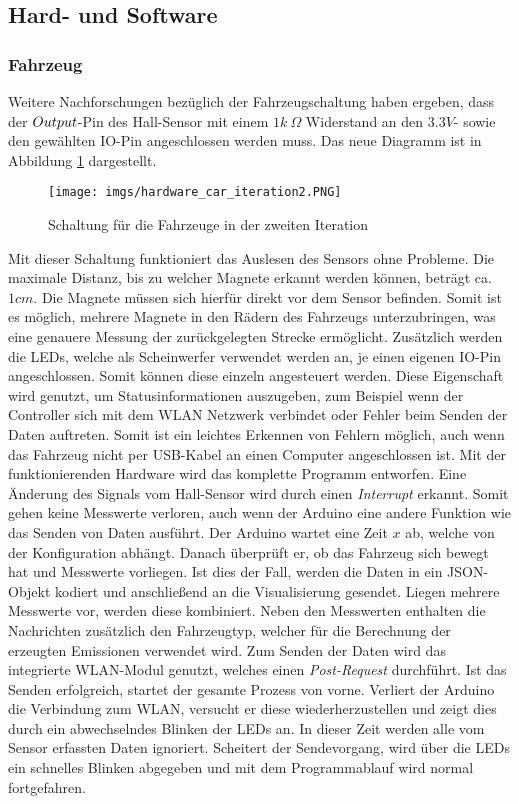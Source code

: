 \documentclass[.../Dokumentation.tex]{subfiles}
\begin{document}
    \subsection{Hard- und Software}\label{sec-ita2-hardware}
    \subsubsection*{Fahrzeug}
    Weitere Nachforschungen bezüglich der Fahrzeugschaltung haben ergeben, dass der $Out\-put$-Pin des Hall-Sensor mit einem $1k\ \Omega$  Widerstand an den $3.3V$- sowie den gewählten IO-Pin angeschlossen werden muss. Das neue Diagramm ist in Abbildung \ref{fig-hardware-car-iteration2} dargestellt.
       	\begin{figure}[H]
    	\begin{center}
    		\texttt{[image: imgs/hardware\_car\_iteration2.PNG]}
    		\caption{Schaltung für die Fahrzeuge in der zweiten Iteration }
    		\label{fig-hardware-car-iteration2}
    	\end{center}
    \end{figure}
    \noindent
    Mit dieser Schaltung funktioniert das Auslesen des Sensors ohne Probleme. Die maximale Distanz, bis zu welcher Magnete erkannt werden können, beträgt ca. $1 cm$. Die Magnete müssen sich hierfür direkt vor dem Sensor befinden. Somit ist es möglich, mehrere Magnete in den Rädern des Fahrzeugs unterzubringen, was eine genauere Messung der zurückgelegten Strecke ermöglicht. Zusätzlich werden die LEDs, welche als Scheinwerfer verwendet werden an, je einen eigenen IO-Pin angeschlossen. Somit können diese einzeln angesteuert werden. Diese Eigenschaft wird genutzt, um Statusinformationen auszugeben, zum Beispiel wenn der Controller sich mit dem WLAN Netzwerk verbindet oder Fehler beim Senden der Daten auftreten. Somit ist ein leichtes Erkennen von Fehlern möglich, auch wenn das Fahrzeug nicht per USB-Kabel an einen Computer angeschlossen ist. 
    Mit der funktionierenden Hardware wird das komplette Programm entworfen. Eine Änderung des Signals vom Hall-Sensor wird durch einen \emph{Interrupt} erkannt. Somit gehen keine Messwerte verloren, auch wenn der Arduino eine andere Funktion wie das Senden von Daten ausführt. Der Arduino wartet eine Zeit $x$ ab, welche von der Konfiguration abhängt. Danach überprüft er, ob das Fahrzeug sich bewegt hat und Messwerte vorliegen. Ist dies der Fall, werden die Daten in ein JSON-Objekt kodiert und anschließend an die Visualisierung gesendet. Liegen mehrere Messwerte vor, werden diese kombiniert. Neben den Messwerten enthalten die Nachrichten zusätzlich den Fahrzeugtyp, welcher für die Berechnung der erzeugten Emissionen verwendet wird. Zum Senden der Daten wird das integrierte WLAN-Modul genutzt, welches einen \emph{Post-Request} durchführt. 
   	Ist das Senden erfolgreich, startet der gesamte Prozess von vorne. Verliert der Arduino die Verbindung zum WLAN, versucht er diese wiederherzustellen und zeigt dies durch ein abwechselndes Blinken der LEDs an. In dieser Zeit werden alle vom Sensor erfassten Daten ignoriert. Scheitert der Sendevorgang, wird über die LEDs ein schnelles  Blinken abgegeben und mit dem Programmablauf wird normal fortgefahren. 
\end{document}
